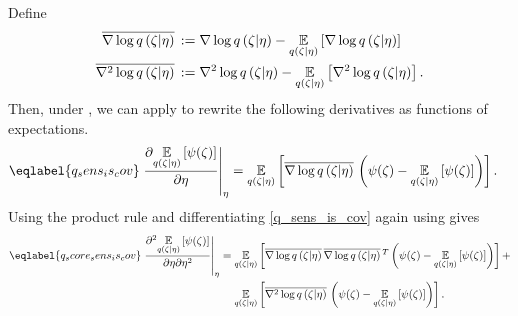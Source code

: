\begin{lem}
%
Define
%
\begin{align*}
%
\lqgradbar{\zeta \vert \eta} :={}& \lqgrad{\zeta \vert \eta}
  - \expect{\q(\zeta \vert \eta)}{\lqgrad{\zeta \vert \eta}} \\
\lqhessbar{\zeta \vert \eta} :={}& \lqhess{\zeta \vert \eta}
 - \expect{\q(\zeta \vert \eta)}{\lqhess{\zeta \vert \eta}}.
%
\end{align*}
%
Then, under , we can apply \citet[Theorem
1]{giordano:2018:covariances} to rewrite the following derivatives as functions
of expectations.
%
\begin{align}\eqlabel{q_sens_is_cov}
%
\fracat{\partial \expect{\q(\zeta \vert \eta)}
              {\psi(\zeta)}}{\partial \eta}{\eta} ={}&
\expect{\q(\zeta \vert \eta)}
       {\lqgradbar{\zeta \vert \eta}
       \left( \psi(\zeta) - \expect{\q(\zeta \vert \eta)}{\psi(\zeta)} \right)}.
%
\end{align}
%
Using the product rule and differentiating \eqref{q_sens_is_cov} again using
gives
%
\begin{align}\eqlabel{q_score_sens_is_cov}
%
\fracat{\partial^2 \expect{\q(\zeta \vert \eta)}
              {\psi(\zeta)}}{\partial \eta \partial \eta^2}{\eta} ={}&
\expect{\q(\zeta \vert \eta)}
       {\lqgradbar{\zeta \vert \eta} \lqgradbar{\zeta \vert \eta}^T
       \left( \psi(\zeta) - \expect{\q(\zeta \vert \eta)}{\psi(\zeta)} \right)} +
\nonumber\\&
\expect{\q(\zeta \vert \eta)}{
       \lqhessbar{\zeta \vert \eta}
       \left( \psi(\zeta) - \expect{\q(\zeta \vert \eta)}{\psi(\zeta)} \right)
       }.
%
\end{align}
%
\end{lem}
